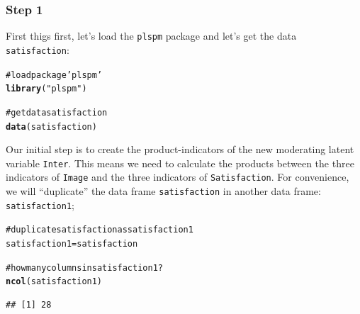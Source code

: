 \documentclass[12pt]{book}\usepackage{graphicx, color}
\makeatletter
\newcommand{\hlfunctioncall}[1]{\textcolor[rgb]{0.501960784313725,0,0.329411764705882}{\textbf{#1}}}%
\newcommand{\hlstring}[1]{\textcolor[rgb]{0.6,0.6,1}{#1}}%
\newcommand{\hlcomment}[1]{\textcolor[rgb]{0.180392156862745,0.6,0.341176470588235}{#1}}%
\newenvironment{kframe}{%
 \def\at@end@of@kframe{}%
 \ifinner\ifhmode%
  \def\at@end@of@kframe{\end{minipage}}%
  \begin{minipage}{\columnwidth}%
 \fi\fi%
 \def\FrameCommand##1{\hskip\@totalleftmargin \hskip-\fboxsep
 \colorbox{shadecolor}{##1}\hskip-\fboxsep
     \hskip-\linewidth \hskip-\@totalleftmargin \hskip\columnwidth}%
 \MakeFramed {\advance\hsize-\width
   \@totalleftmargin\z@ \linewidth\hsize
   \@setminipage}}%
 {\par\unskip\endMakeFramed%
 \at@end@of@kframe}
\newenvironment{knitrout}{}{} %
\newcommand{\plspm}{\texttt{plspm}}
\newcommand{\code}[1]{\texttt{#1}}
\makeatother
\begin{document}
\subsubsection*{Step 1}
First thigs first, let's load the \plspm{} package and let's get the data \code{satisfaction}: 
\begin{knitrout}
\color{fgcolor}\begin{kframe}
\begin{alltt}
\hlcomment{# load package 'plspm'}
\hlfunctioncall{library}(\hlstring{"plspm"})

\hlcomment{# get data satisfaction}
\hlfunctioncall{data}(satisfaction)
\end{alltt}
\end{kframe}
\end{knitrout}


Our initial step is to create the product-indicators of the new moderating latent variable \texttt{Inter}. 
This means we need to calculate the products between the three indicators of \texttt{Image} and the three indicators of \texttt{Satisfaction}. For convenience, we will ``duplicate'' the data frame \code{satisfaction} in another data frame: \code{satisfaction1};
\begin{knitrout}
\color{fgcolor}\begin{kframe}
\begin{alltt}
\hlcomment{# duplicate satisfaction as satisfaction1}
satisfaction1 = satisfaction

\hlcomment{# how many columns in satisfaction1?}
\hlfunctioncall{ncol}(satisfaction1)
\end{alltt}
\begin{verbatim}
## [1] 28
\end{verbatim}
\end{kframe}
\end{knitrout}
\end{document}
